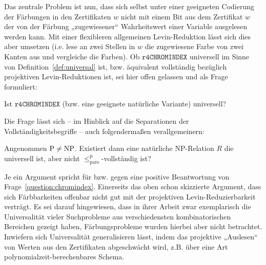 Das zentrale Problem ist nun, dass sich selbst unter einer geeigneten Codierung der Färbungen in den Zertifikaten $w$ nicht mit einem Bit aus dem Zertifikat $w$ der von der Färbung „zugewiesener“ Wahrheitswert einer Variable ausgelesen werden kann. Mit einer flexibleren allgemeinen Levin-Reduktion lässt sich dies aber umsetzen (i.e. lese an zwei Stellen in $w$ die zugewiesene Farbe von zwei Kanten aus und vergleiche die Farben). Ob $\mathtt{r4CHROMINDEX}$ universell im Sinne von Definition~\ref{def:universal} ist, bzw. äquivalent vollständig bezüglich projektiven Levin-Reduktionen ist, sei hier offen gelassen und als Frage formuliert:
\begin{question}\label{question:chromindex}
    Ist $\mathtt{r4CHROMINDEX}$ (bzw. eine geeignete natürliche Variante) universell?
\end{question}
Die Frage lässt sich -- im Hinblick auf die Separationen der Vollständigkeitsbegriffe -- auch  folgendermaßen verallgemeinern:
\begin{question}
    Angenommen $\mathrm{P}\neq\mathrm{NP}$.
    Existiert dann eine natürliche NP-Relation $R$ die universell ist, aber nicht $\leq_\mathrm{pars}^\mathrm p$-vollständig ist?
\end{question}

Je ein Argument spricht für bzw. gegen eine positive Beantwortung von Frage~\ref{question:chromindex}.
Einerseits das oben schon skizzierte Argument, dass sich Färbbarkeiten offenbar nicht gut mit der projektiven Levin-Reduzierbarkeit verträgt.  Es sei darauf hingewiesen, dass \textcite{agrawal_universal_1992} in ihrer Arbeit zwar exemplarisch die Universalität vieler Suchprobleme aus verschiedensten kombinatorischen Bereichen gezeigt haben, Färbungsprobleme wurden hierbei aber nicht betrachtet. 
Inwiefern sich Universalität generalisieren lässt, indem das projektive „Auslesen“ von Werten aus den Zertifikaten abgeschwächt wird, z.B. über eine Art polynomialzeit-berechenbares Schema.

